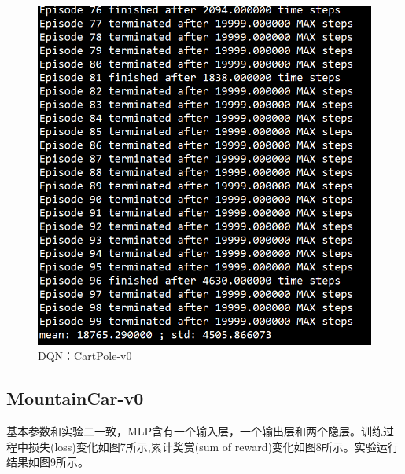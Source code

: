 \documentclass[a4paper,UTF8]{article}
\theoremstyle{definition}
\begin{document}
    \begin{center}
    \begin{figure}[H]
          \centering
          \includegraphics[width=12cm]{4.png}
          \caption{DQN：CartPole-v0}
          \label{fig:2.3}
    \end{figure}
    \end{center}
    \subsection{MountainCar-v0}
    基本参数和实验二一致，MLP含有一个输入层，一个输出层和两个隐层。训练过程中损失(loss)变化如图7所示,累计奖赏(sum of reward)变化如图8所示。实验运行结果如图9所示。
    
\end{document}
